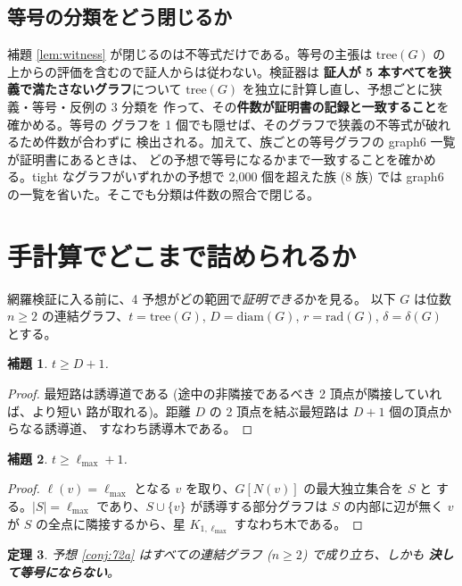 \documentclass[paper=a4,fontsize=10.5pt,jafontsize=10.5pt]{jlreq}
\theoremstyle{plain}
\newtheorem{theorem}{定理}[section]
\newtheorem{lemma}[theorem]{補題}
\theoremstyle{definition}
\begin{document}
\subsection{等号の分類をどう閉じるか}\label{sec:tight}

補題 \ref{lem:witness} が閉じるのは不等式だけである。等号の主張は
$\mathrm{tree}(G)$ の上からの評価を含むので証人からは従わない。検証器は
\textbf{証人が 5 本すべてを狭義で満たさないグラフ}について
$\mathrm{tree}(G)$ を独立に計算し直し、予想ごとに狭義・等号・反例の 3 分類を
作って、その\textbf{件数が証明書の記録と一致すること}を確かめる。等号の
グラフを 1 個でも隠せば、そのグラフで狭義の不等式が破れるため件数が合わずに
検出される。加えて、族ごとの等号グラフの graph6 一覧が証明書にあるときは、
どの予想で等号になるかまで一致することを確かめる。tight なグラフがいずれかの予想で 2,000 個を超えた族 (8 族) では graph6 の一覧を省いた。そこでも分類は件数の照合で閉じる。

\section{手計算でどこまで詰められるか}\label{sec:hand}

網羅検証に入る前に、4 予想がどの範囲で\emph{証明できる}かを見る。
以下 $G$ は位数 $n \ge 2$ の連結グラフ、$t = \mathrm{tree}(G)$,
$D = \mathrm{diam}(G)$, $r = \mathrm{rad}(G)$, $\delta = \delta(G)$ とする。

\begin{lemma}\label{lem:diam}
$t \ge D + 1$.
\end{lemma}

\begin{proof}
最短路は誘導道である (途中の非隣接であるべき 2 頂点が隣接していれば、より短い
路が取れる)。距離 $D$ の 2 頂点を結ぶ最短路は $D+1$ 個の頂点からなる誘導道、
すなわち誘導木である。
\end{proof}

\begin{lemma}\label{lem:ell}
$t \ge \ell_{\max} + 1$.
\end{lemma}

\begin{proof}
$\ell(v) = \ell_{\max}$ となる $v$ を取り、$G[N(v)]$ の最大独立集合を $S$ と
する。$|S| = \ell_{\max}$ であり、$S \cup \{v\}$ が誘導する部分グラフは
$S$ の内部に辺が無く $v$ が $S$ の全点に隣接するから、星
$K_{1,\ell_{\max}}$ すなわち木である。
\end{proof}

\begin{theorem}\label{thm:72a}
予想 \ref{conj:72a} はすべての連結グラフ ($n \ge 2$) で成り立ち、しかも
\textbf{決して等号にならない}。
\end{theorem}
\end{document}
